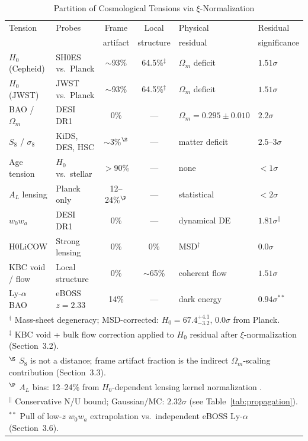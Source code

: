 \documentclass[twocolumn]{aastex631}
\begin{document}
\begin{table}
\centering
\caption{Partition of Cosmological Tensions via $\xi$-Normalization}
\label{tab:tensions}
\begin{tabular}{llccll}
\toprule
Tension & Probes & Frame & Local & Physical & Residual \\
        &        & artifact & structure & residual & significance \\
\midrule
$H_0$ (Cepheid) & SH0ES vs.\ Planck & $\sim$93\% & 64.5\%$^\ddagger$ & $\Omega_m$ deficit & $1.51\sigma$ \\
$H_0$ (JWST)    & JWST vs.\ Planck  & $\sim$93\% & 64.5\%$^\ddagger$ & $\Omega_m$ deficit & $1.51\sigma$ \\
BAO / $\Omega_m$ & DESI DR1         & 0\% & --- & $\Omega_m = 0.295\pm0.010$ & $2.2\sigma$ \\
$S_8$ / $\sigma_8$ & KiDS, DES, HSC & $\sim$3\%$^\S$ & --- & matter deficit & $2.5$--$3\sigma$ \\
Age tension      & $H_0$ vs.\ stellar & $>$90\% & --- & none & $<1\sigma$ \\
$A_L$ lensing    & Planck only       & 12--24\%$^\P$ & --- & statistical & $<2\sigma$ \\
$w_0 w_a$        & DESI DR1          & 0\% & --- & dynamical DE & $1.81\sigma$$^\|$ \\
H0LiCOW         & Strong lensing    & 0\% & 0\% & MSD$^\dagger$ & $0.0\sigma$ \\
KBC void / flow  & Local structure   & 0\% & $\sim$65\% & coherent flow & $1.51\sigma$ \\
Ly-$\alpha$ BAO  & eBOSS $z=2.33$   & 14\% & --- & dark energy & $0.94\sigma$$^{**}$ \\
\bottomrule
\multicolumn{6}{l}{$^\dagger$ Mass-sheet degeneracy; \citet{Birrer2021} MSD-corrected: $H_0 = 67.4^{+4.1}_{-3.2}$, $0.0\sigma$ from Planck.} \\
\multicolumn{6}{l}{$^\ddagger$ KBC void + bulk flow correction applied to $H_0$ residual after $\xi$-normalization (Section~3.2).} \\
\multicolumn{6}{l}{$^\S$ $S_8$ is not a distance; frame artifact fraction is the indirect $\Omega_m$-scaling contribution (Section~3.3).} \\
\multicolumn{6}{l}{$^\P$ $A_L$ bias: 12--24\% from $H_0$-dependent lensing kernel normalization \citep{Planck2020}.} \\
\multicolumn{6}{l}{$^\|$ Conservative N/U bound; Gaussian/MC: $2.32\sigma$ (see Table~\ref{tab:propagation}).} \\
\multicolumn{6}{l}{$^{**}$ Pull of low-$z$ $w_0w_a$ extrapolation vs.\ independent eBOSS Ly-$\alpha$ (Section~3.6).}
\end{tabular}
\end{table}
\end{document}
